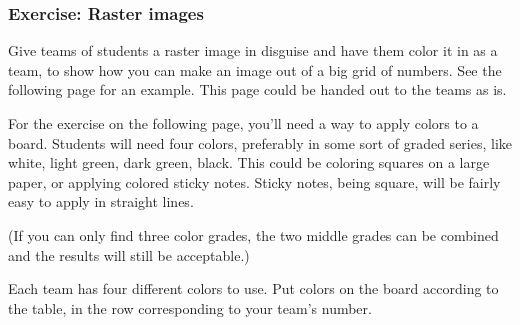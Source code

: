 \documentclass[11pt]{article}
\begin{document}
\subsubsection{Exercise: Raster images}

Give teams of students a raster image in disguise and have them color
it in as a team, to show how you can make an image out of a big grid
of numbers.  See the following page for an example.  This page could
be handed out to the teams as is.

For the exercise on the following page, you'll need a way to apply
colors to a board.  Students will need four colors, preferably in some
sort of graded series, like white, light green, dark green, black.
This could be coloring squares on a large paper, or applying colored
sticky notes.  Sticky notes, being square, will be fairly easy to
apply in straight lines.

(If you can only find three color grades, the two middle grades can be
combined and the results will still be acceptable.)

\newpage
\thispagestyle{empty}

Each team has four different colors to use. Put colors on the board
according to the table, in the row corresponding to your team's
number.

\newcommand{\propmeup}{\raisebox{-9pt}{\rule{0pt}{25pt}}}
\end{document}
